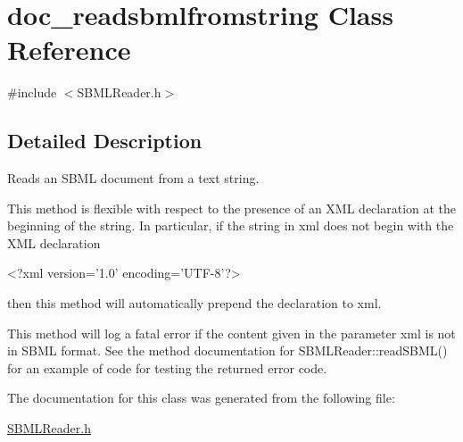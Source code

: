 \hypertarget{classdoc__readsbmlfromstring}{}\section{doc\+\_\+readsbmlfromstring Class Reference}
\label{classdoc__readsbmlfromstring}


{\ttfamily \#include $<$S\+B\+M\+L\+Reader.\+h$>$}



\subsection{Detailed Description}
Reads an S\+B\+ML document from a text string.

This method is flexible with respect to the presence of an X\+ML declaration at the beginning of the string. In particular, if the string in {\ttfamily xml} does not begin with the X\+ML declaration \begin{DoxyVerb}<?xml version='1.0' encoding='UTF-8'?>
\end{DoxyVerb}
 then this method will automatically prepend the declaration to {\ttfamily xml}.

This method will log a fatal error if the content given in the parameter {\ttfamily xml} is not in S\+B\+ML format. See the method documentation for S\+B\+M\+L\+Reader\+::read\+S\+B\+M\+L() for an example of code for testing the returned error code. 

The documentation for this class was generated from the following file\+:\begin{DoxyCompactItemize}
\item 
\hyperlink{_s_b_m_l_reader_8h}{S\+B\+M\+L\+Reader.\+h}\end{DoxyCompactItemize}

